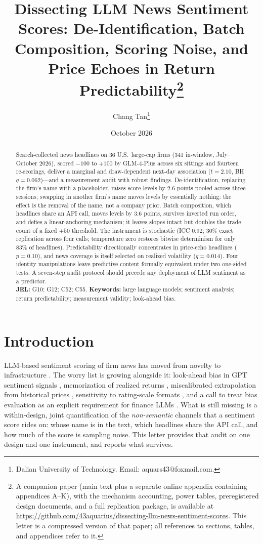 \documentclass[11pt]{article}
\title{\bfseries Dissecting LLM News Sentiment Scores: De-Identification, Batch Composition, Scoring Noise, and Price Echoes in Return Predictability\thanks{A companion paper (main text plus a separate online appendix containing appendices A--K), with the mechanism accounting, power tables, preregistered design documents, and a full replication package, is available at \url{https://github.com/43aquarius/dissecting-llm-news-sentiment-scores}. This letter is a compressed version of that paper; all references to sections, tables, and appendices refer to it.}}
\author{Chang Tan\thanks{Dalian University of Technology. Email: aquars43@foxmail.com.}}
\date{October 2026}
\begin{document}
\maketitle

\begin{abstract}
\noindent Search-collected news headlines on 36 U.S.\ large-cap firms (341 in-window, July--October 2026), scored $-100$ to $+100$ by GLM-4-Plus across six sittings and fourteen re-scorings, deliver a marginal and draw-dependent next-day association ($t=2.10$, BH $q=0.062$)---and a measurement audit with robust findings. De-identification, replacing the firm's name with a placeholder, raises score levels by 2.6 points pooled across three sessions; swapping in another firm's name moves levels by essentially nothing: the effect is the removal of the name, not a company prior. Batch composition, which headlines share an API call, moves levels by 3.6 points, survives inverted run order, and defies a linear-anchoring mechanism; it leaves slopes intact but doubles the trade count of a fixed $+50$ threshold. The instrument is stochastic (ICC $0.92$; 30\% exact replication across four calls; temperature zero restores bitwise determinism for only 83\% of headlines). Predictability directionally concentrates in price-echo headlines ($p=0.10$), and news coverage is itself selected on realized volatility ($q=0.014$). Four identity manipulations leave predictive content formally equivalent under two one-sided tests. A seven-step audit protocol should precede any deployment of LLM sentiment as a predictor. \\[2pt]
\textbf{JEL:} G10; G12; C52; C55. \textbf{Keywords:} large language models; sentiment analysis; return predictability; measurement validity; look-ahead bias.
\end{abstract}

\section{Introduction}

LLM-based sentiment scoring of firm news has moved from novelty to infrastructure \citep{lopezlira2026,kirtac2024}. The worry list is growing alongside it: look-ahead bias in GPT sentiment signals \citep{glasserman2023}, memorization of realized returns \citep{lopezlira2025,didisheim2025}, miscalibrated extrapolation from historical prices \citep{chen2025}, sensitivity to rating-scale formats \citep{jo2026}, and a call to treat bias evaluation as an explicit requirement for finance LLMs \citep{kong2026}. What is still missing is a within-design, joint quantification of the \emph{non-semantic} channels that a sentiment score rides on: whose name is in the text, which headlines share the API call, and how much of the score is sampling noise. This letter provides that audit on one design and one instrument, and reports what survives.
\end{document}
